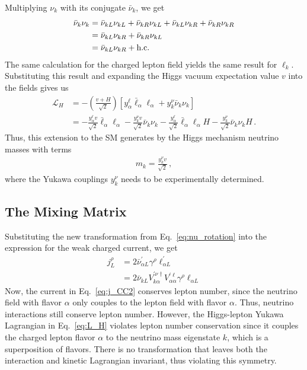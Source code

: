 Multiplying $\nu_k$ with its conjugate $\bar{\nu}_k$, we get 
\begin{align}
    \bar{\nu}_k \nu_k 
    & = \bar{\nu}_{k L} \nu_{k L} +\bar{\nu}_{k R}\nu_{k L} + \bar{\nu}_{k L}\nu_{k R} + \bar{\nu}_{k R}\nu_{k R} \nonumber \\
    & = \bar{\nu}_{k L}\nu_{k R} + \bar{\nu}_{k R}\nu_{k L} \nonumber \\
    & = \bar{\nu}_{k L}\nu_{k R} + \text{{h.c.}}
\end{align}
The same calculation for the charged lepton field yields the same result for $\ell_k$. Substituting this result and expanding the Higgs vacuum expectation value $v$ into the fields gives us
\begin{align}
    \mathcal{L}_{H} 
    &=-\left( \frac{v + H}{\sqrt{2}} \right) \left[ y_{\alpha}^{\ell}   \bar{\ell}_\alpha \ell_\alpha  +  y_{k}^{\nu} \bar{\nu}_k \nu_k \right] \nonumber \\
    &=- \frac{y_{\alpha}^{\ell} v}{\sqrt{2}}   \bar{\ell}_\alpha \ell_\alpha   -  \frac{ y_{k}^{\nu} v}{\sqrt{2}} \bar{\nu}_k \nu_k  - \frac{y_{\alpha}^{\ell}}{\sqrt{2}}   \bar{\ell}_\alpha \ell_\alpha H  -  \frac{ y_{k}^{\nu}}{\sqrt{2}} \bar{\nu}_k \nu_k H\,.
\end{align}
Thus, this extension to the SM generates by the Higgs mechanism neutrino masses with terms
\begin{align}
    m_k = \frac{y_k^\nu v}{\sqrt{2}}\,,
\end{align}
where the Yukawa couplings $y^\nu_k$ needs to be experimentally determined.
\subsection{The Mixing Matrix}
Substituting the new transformation from Eq.~\ref{eq:nu_rotation} into the expression for the weak charged current, we get
\begin{align}\label{eq:j_CC2}
    j^\rho_L &= 2\bar{\nu}^\prime_{\alpha L} \gamma^\rho \ell_{\alpha L}^\prime \nonumber \\
             &= 2\bar{\nu}_{k L} V^{\prime \nu \dagger}_{k \alpha}V^{\prime \ell}_{\alpha \alpha} \gamma^\rho  \ell_{\alpha L}
\end{align}
Now, the current in Eq.~\ref{eq:j_CC2} conserves lepton number, since the neutrino field with flavor $\alpha$ only couples to the lepton field with flavor $\alpha$. 
Thus, neutrino interactions still conserve lepton number.
However, the Higgs-lepton Yukawa Lagrangian 
in Eq.~\ref{eq:L_H} violates lepton number conservation since it couples the charged lepton flavor $\alpha$ to the neutrino mass eigenstate $k$, which is a superposition of flavors. 
There is no transformation that leaves both the interaction and kinetic Lagrangian invariant, thus violating this symmetry.


